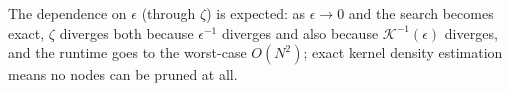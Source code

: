 








The dependence on $\epsilon$ (through $\zeta$) is expected: as $\epsilon \to 0$
and the search becomes exact, $\zeta$ diverges both because $\epsilon^{-1}$
diverges and also because $\mathcal{K}^{-1}(\epsilon)$ diverges, and the runtime
goes to the worst-case $O(N^2)$; exact kernel density estimation means no nodes
can be pruned at all.


